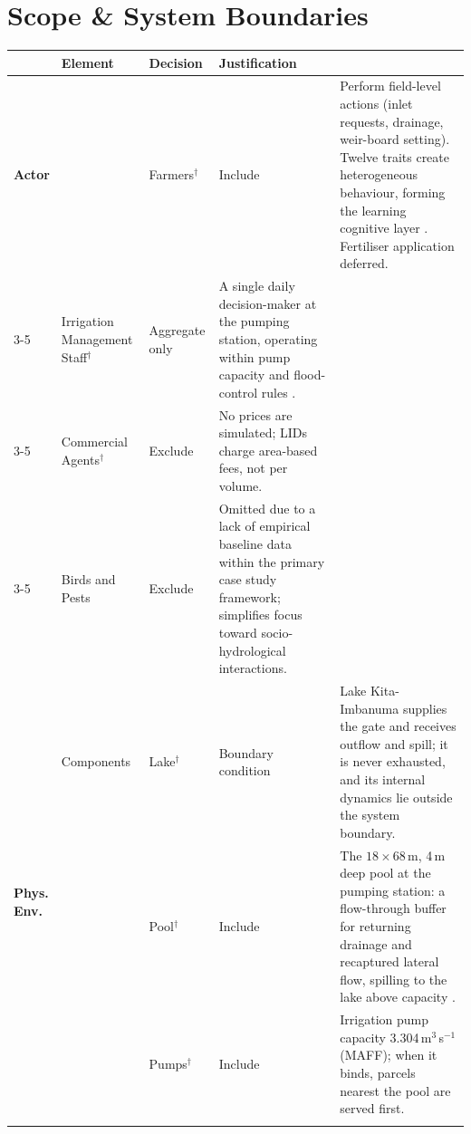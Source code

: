 \documentclass{article}
\begin{document}
\section{Scope \& System Boundaries}
\begin{changed}
\centering
\small
\begin{tabular}{|p{0.5cm}|p{1.6cm}|p{2.2cm}|p{1.6cm}|p{10.8cm}|}
     \hline
     \rowcolor[HTML]{F8F319}
     \multicolumn{2}{|l|}{\textbf{Category}} & \textbf{Element} & \textbf{Decision} & \textbf{Justification} \\ \hline
     \multicolumn{2}{|p{2.1cm}|}{\textbf{Actor}}
     & Farmers$^\dagger$ & Include & Perform field-level actions (inlet requests, drainage, weir-board setting). Twelve traits create heterogeneous behaviour, forming the learning cognitive layer \cite{Alam2022, Wens2021, Tao2021DigitalTwin}. Fertiliser application deferred. \\ \cline{3-5}
     \multicolumn{2}{|l|}{} & Irrigation Management Staff$^\dagger$ & Aggregate only & A single daily decision-maker at the pumping station, operating within pump capacity and flood-control rules \cite{Kada2005LID, Shiozawa2011, OkuraBudiasaKato2022}. \\ \cline{3-5}
     \multicolumn{2}{|l|}{} & Commercial Agents$^\dagger$ & Exclude & No prices are simulated; LIDs charge area-based fees, not per volume. \\ \cline{3-5}
     \multicolumn{2}{|l|}{} & Birds and Pests & Exclude & Omitted due to a lack of empirical baseline data within the primary case study framework; simplifies focus toward socio-hydrological interactions.\\ \hline
     \multirow{16}{*}{\parbox{0.5cm}{\textbf{Phys.\\Env.}}} & Components & Lake$^\dagger$ & Boundary condition & Lake Kita-Imbanuma supplies the gate and receives outflow and spill; it is never exhausted, and its internal dynamics lie outside the system boundary. \\ \cline{3-5}
     & & Pool$^\dagger$ & Include & The $18\times68$\,m, 4\,m deep pool at the pumping station: a flow-through buffer for returning drainage and recaptured lateral flow, spilling to the lake above capacity \cite{Okura2025WaterBalance}. \\ \cline{3-5}
     & & Pumps$^\dagger$ & Include & Irrigation pump capacity 3.304\,m$^3$\,s$^{-1}$ (MAFF); when it binds, parcels nearest the pool are served first. \\ \cline{3-5}

\end{tabular}
\end{changed}
\end{document}
